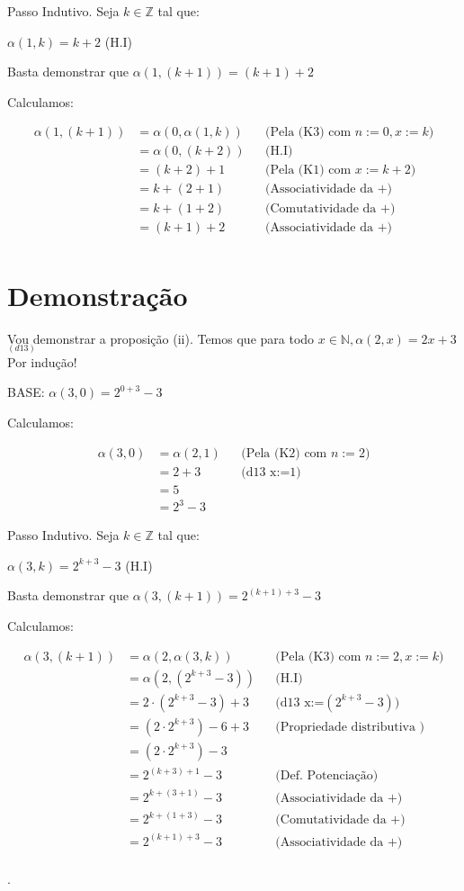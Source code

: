 \documentclass[a4paper]{article}
\def\ints{{\mathbb Z}}
\def\nats{{\mathbb N}}
\def\by#1{&& \text{(#1)}\\}
\def\halmos{ \begin{flushright} \RectangleBold \end{flushright}}
\begin{document}
Passo Indutivo. Seja $k\in \ints$ tal que:

\begin{center} $\alpha(1,k)=k+2 $  (H.I)\end{center}

Basta demonstrar que $\alpha(1,(k+1))=(k+1)+2 $\newline

Calculamos:

\begin{align*}
\alpha(1,(k+1))& =\alpha(0,\alpha (1,k))    \by {Pela (K3) com $n:=0, x:=k$}
& =\alpha(0,(k+2))                          \by {H.I}
& = (k+2)+1                                 \by {Pela (K1) com $x:=k+2$}
& = k+(2+1)                                 \by {Associatividade da +}
& = k+(1+2)                                 \by {Comutatividade da +}
& = (k+1)+2                                 \by {Associatividade da +}
\end{align*}

 \halmos

\newpage

\section*{Demonstração}

Vou demonstrar a proposição (ii).\newline
Temos que para todo $x \in \nats, \alpha(2, x) = 2x + 3$$_{(d13)}$\\
Por indução!

BASE: $\alpha(3, 0) = 2^{0+3}-3$

Calculamos:


\begin{align*}
\alpha(3,0)& = \alpha(2,1)          \by {Pela (K2) com $n:=2$}
& =2+3                              \by {d13 x:=1}
& = 5\\
& = 2^3-3
\end{align*}

Passo Indutivo. Seja $k\in \ints$ tal que:

\begin{center} $\alpha(3, k) = 2^{k+3}-3$  (H.I)\end{center}

Basta demonstrar que  $\alpha(3, (k+1)) = 2^{(k+1)+3}-3$ \newline

Calculamos:

\begin{align*}
\alpha(3,(k+1))& =\alpha(2,\alpha (3,k))    \by {Pela (K3) com $n:=2, x:=k$}
& =\alpha(2,(2^{k+3}-3))                          \by {H.I}
& = 2\cdot(2^{k+3}-3)+3                                 \by {d13 x:=$(2^{k+3}-3)$}
& =  (2\cdot2^{k+3})-6+3                                 \by {Propriedade distributiva }
& = (2\cdot2^{k+3})-3                                  \\
& = 2^{(k+3)+1}-3                                \by {Def. Potenciação}
& = 2^{k+(3+1)}-3                                \by {Associatividade da +}
& = 2^{k+(1+3)}-3                                \by {Comutatividade da +}
& = 2^{(k+1)+3}-3                                \by {Associatividade da +}
\end{align*}

 \halmos
\pagestyle{fancy}.
\end{document}
